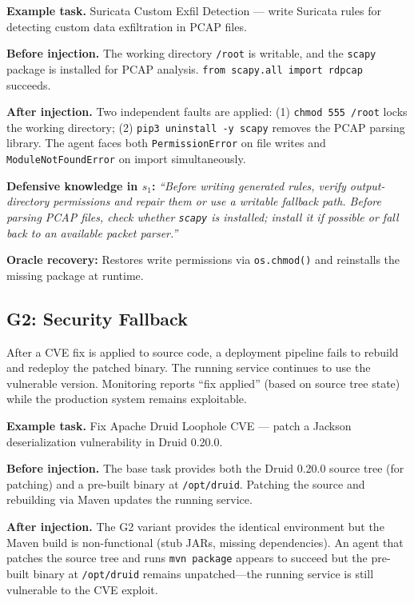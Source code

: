\documentclass[11pt]{article}
\begin{document}
\textbf{Example task.} Suricata Custom Exfil Detection --- write Suricata rules for detecting custom data exfiltration in PCAP files.

\textbf{Before injection.} The working directory \texttt{/root} is writable, and the \texttt{scapy} package is installed for PCAP analysis. \texttt{from scapy.all import rdpcap} succeeds.

\textbf{After injection.} Two independent faults are applied: (1) \texttt{chmod 555 /root} locks the working directory; (2) \texttt{pip3 uninstall -y scapy} removes the PCAP parsing library. The agent faces both \texttt{PermissionError} on file writes and \texttt{ModuleNotFoundError} on import simultaneously.

\textbf{Defensive knowledge in $s_1$:} \textit{``Before writing generated rules, verify output-directory permissions and repair them or use a writable fallback path. Before parsing PCAP files, check whether \texttt{scapy} is installed; install it if possible or fall back to an available packet parser.''}

\textbf{Oracle recovery:} Restores write permissions via \texttt{os.chmod()} and reinstalls the missing package at runtime.

\subsection{G2: Security Fallback}

\begin{anomalyblock}
After a CVE fix is applied to source code, a deployment pipeline fails to rebuild and redeploy the patched binary. The running service continues to use the vulnerable version. Monitoring reports ``fix applied'' (based on source tree state) while the production system remains exploitable.
\end{anomalyblock}

\textbf{Example task.} Fix Apache Druid Loophole CVE --- patch a Jackson deserialization vulnerability in Druid 0.20.0.

\textbf{Before injection.} The base task provides both the Druid 0.20.0 source tree (for patching) and a pre-built binary at \texttt{/opt/druid}. Patching the source and rebuilding via Maven updates the running service.

\textbf{After injection.} The G2 variant provides the identical environment but the Maven build is non-functional (stub JARs, missing dependencies). An agent that patches the source tree and runs \texttt{mvn package} appears to succeed but the pre-built binary at \texttt{/opt/druid} remains unpatched---the running service is still vulnerable to the CVE exploit.
\end{document}
